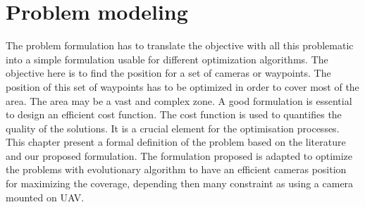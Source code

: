 \chapter{Problem modeling}\label{chap:formulation}
\minitoc

%
%	




The problem formulation has to translate the objective with all this problematic into a simple formulation usable for different optimization algorithms. 
The objective here is to find the position for a set of cameras or waypoints. The position of this set of waypoints has to be optimized in order to cover most of the area. The area may be a vast and complex zone.
A good formulation is essential to design an efficient cost function. The cost function is used to quantifies the quality of the solutions. It is a crucial element for the optimisation processes.\\
This chapter present  a formal definition of the problem based on the literature and  our proposed formulation. The formulation proposed is adapted to optimize the problems with evolutionary algorithm to have an efficient cameras position for maximizing the coverage, depending then many constraint as using a camera mounted on UAV.

